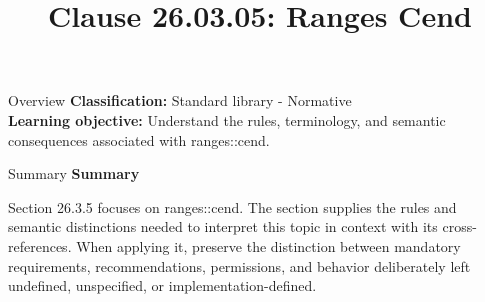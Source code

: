 \documentclass[10pt,letterpaper]{article}
\title{Clause 26.03.05: Ranges Cend}
\author{}
\date{}
\begin{document}
\maketitle
\begin{CornellOverviewBox}{Overview}
\textbf{Classification:} Standard library - Normative\\[2pt]
\textbf{Learning objective:} Understand the rules, terminology, and semantic consequences associated with ranges::cend.
\end{CornellOverviewBox}\begin{CornellSummaryBox}{Summary}
{\sffamily\bfseries\color{Accent} Summary}\par\vspace{3pt}Section 26.3.5 focuses on ranges::cend. The section supplies the rules and semantic distinctions needed to interpret this topic in context with its cross-references. When applying it, preserve the distinction between mandatory requirements, recommendations, permissions, and behavior deliberately left undefined, unspecified, or implementation-defined.
\end{CornellSummaryBox}
\end{document}
